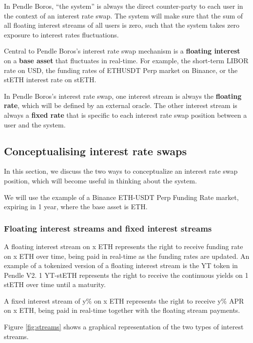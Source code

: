 \documentclass{article}%
\begin{document}
In Pendle Boros, ``the system'' is always the direct counter-party to each user in the context of an interest rate swap. The system will make sure that the sum of all floating interest streams of all users is zero, such that the system takes zero exposure to interest rates fluctuations.

Central to Pendle Boros's interest rate swap mechanism is a \textbf{floating interest} on a \textbf{base asset} that fluctuates in real-time. For example, the short-term LIBOR rate on USD, the funding rates of ETHUSDT Perp market on Binance, or the stETH interest rate on stETH.

In Pendle Boros's interest rate swap, one interest stream is always the \textbf{floating rate}, which will be defined by an external oracle. The other interest stream is always a \textbf{fixed rate} that is specific to each interest rate swap position between a user and the system.

\subsection{Conceptualising interest rate swaps}
In this section, we discuss the two ways to conceptualize an interest rate swap position, which will become useful in thinking about the system.

We will use the example of a Binance ETH-USDT Perp Funding Rate market, expiring in 1 year, where the base asset is ETH.

\subsubsection{Floating interest streams and fixed interest streams}
A floating interest stream on x ETH represents the right to receive funding rate on x ETH over time, being paid in real-time as the funding rates are updated. An example of a tokenized version of a floating interest stream is the YT token in Pendle V2. 1 YT-stETH represents the right to receive the continuous yields on 1 stETH over time until a maturity.

A fixed interest stream of y\% on x ETH represents the right to receive y\% APR on x ETH, being paid in real-time together with the floating stream payments.

Figure \ref{fig:streams} shows a graphical representation of the two types of interest streams.
\end{document}
